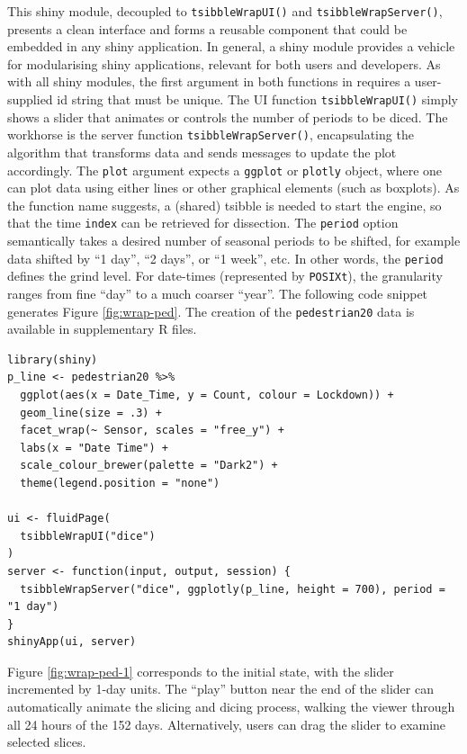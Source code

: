 This shiny module, decoupled to \texttt{tsibbleWrapUI()} and \texttt{tsibbleWrapServer()}, presents a clean interface and forms a reusable component that could be embedded in any shiny application. In general, a shiny module provides a vehicle for modularising shiny applications, relevant for both users and developers. As with all shiny modules, the first argument in both functions in  requires a user-supplied id string that must be unique. The UI function \texttt{tsibbleWrapUI()} simply shows a slider that animates or controls the number of periods to be diced. The workhorse is the server function \texttt{tsibbleWrapServer()}, encapsulating the algorithm that transforms data and sends messages to update the plot accordingly. The \texttt{plot} argument expects a \texttt{ggplot} or \texttt{plotly} object, where one can plot data using either lines or other graphical elements (such as boxplots). As the function name suggests, a (shared) tsibble is needed to start the engine, so that the time \texttt{index} can be retrieved for dissection. The \texttt{period} option semantically takes a desired number of seasonal periods to be shifted, for example data shifted by ``1 day'', ``2 days'', or ``1 week'', etc. In other words, the \texttt{period} defines the grind level. For date-times (represented by \texttt{POSIXt}), the granularity ranges from fine ``day'' to a much coarser ``year''. The following code snippet generates Figure \ref{fig:wrap-ped}. The creation of the \texttt{pedestrian20} data is available in supplementary R files.

\begin{verbatim}
library(shiny)
p_line <- pedestrian20 %>%
  ggplot(aes(x = Date_Time, y = Count, colour = Lockdown)) +
  geom_line(size = .3) +
  facet_wrap(~ Sensor, scales = "free_y") +
  labs(x = "Date Time") +
  scale_colour_brewer(palette = "Dark2") +
  theme(legend.position = "none")

ui <- fluidPage(
  tsibbleWrapUI("dice")
)
server <- function(input, output, session) {
  tsibbleWrapServer("dice", ggplotly(p_line, height = 700), period = "1 day")
}
shinyApp(ui, server)
\end{verbatim}

Figure \ref{fig:wrap-ped-1} corresponds to the initial state, with the slider incremented by 1-day units. The ``play'' button near the end of the slider can automatically animate the slicing and dicing process, walking the viewer through all 24 hours of the 152 days. Alternatively, users can drag the slider to examine selected slices.

